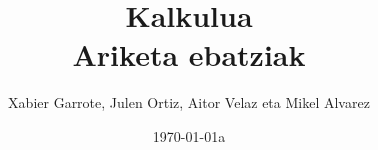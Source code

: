 \documentclass[12pt,epsf]{basque-book}
\renewcommand{\thepage}{\roman{page}}
\theoremstyle{change}
\begin{document}
\renewcommand{\chaptername}{Gaia}
\renewcommand{\DOCH}{\CNoV \thechapter \space \CNV \FmN{\chaptername} \par\nobreak}

\setcounter{secnumdepth}{3}

%
%
%
%
%
%

%
%
%
%
%
%
%
%
%
%
%
%


\title{ \textbf{Kalkulua \\ Ariketa ebatziak} }

\author{Xabier Garrote, Julen Ortiz, Aitor Velaz eta Mikel Alvarez}

\date{\today a}


\maketitle

\setcounter{page}{1}

\tableofcontents


\vfill{}
%
%
%
%
%
%
\pagebreak

\renewcommand{\thepage}{\arabic{page}}

\setcounter{page}{1}


%
%
%


%

%

\printindex
\end{document}
